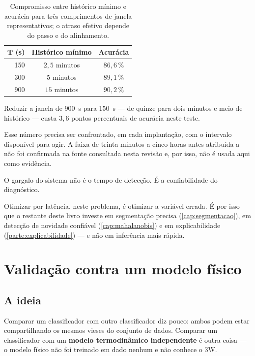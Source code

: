 \begin{table}[htbp]
\centering
\caption{Compromisso entre histórico mínimo e acurácia para três comprimentos de janela
representativos; o atraso efetivo depende do passo e do alinhamento.}
\label{tab:closed-tempo}
\begin{tabular}{rcc}
\toprule
$\bm{T}$ \textbf{(s)} & \textbf{Histórico mínimo} & \textbf{Acurácia} \\
\midrule
150  & $2{,}5$ minutos & $86{,}6\,\%$ \\
300  & $5$ minutos     & $89{,}1\,\%$ \\
900  & $15$ minutos    & $90{,}2\,\%$ \\
\bottomrule
\end{tabular}
\end{table}

\begin{resultadochave}
Reduzir a janela de \SI{900}{\second} para \SI{150}{\second} --- de quinze para dois
minutos e meio de histórico --- custa $3{,}6$ pontos percentuais de acurácia neste teste.
\end{resultadochave}

Esse número precisa ser confrontado, em cada implantação, com o intervalo disponível
para agir. A faixa de trinta minutos a cinco horas antes atribuída a
\citet{VARGAS2019} não foi confirmada na fonte consultada nesta revisão e, por isso, não
é usada aqui como evidência.

\begin{destaque}
O gargalo do sistema não é o tempo de detecção. É a confiabilidade do diagnóstico.

Otimizar por latência, neste problema, é otimizar a variável errada. É por isso que o
restante deste livro investe em segmentação precisa (\cref{cap:segmentacao}), em
detecção de novidade confiável (\cref{cap:mahalanobis}) e em explicabilidade
(\cref{parte:explicabilidade}) --- e não em inferência mais rápida.
\end{destaque}

\section{Validação contra um modelo físico}

\subsection{A ideia}

Comparar um classificador com outro classificador diz pouco: ambos podem estar
compartilhando os mesmos vieses do conjunto de dados. Comparar um classificador com um
\textbf{modelo termodinâmico independente} é outra coisa --- o modelo físico não foi
treinado em dado nenhum e não conhece o 3W.

